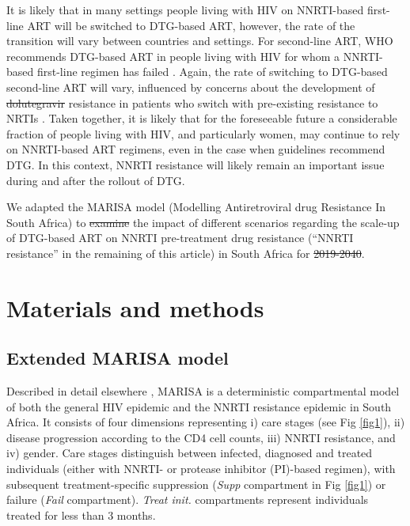 \documentclass[10pt,letterpaper]{article}
\providecommand{\DIFaddtex}[1]{{\protect\color{blue}\uwave{#1}}} %
\providecommand{\DIFdeltex}[1]{{\protect\color{red}\sout{#1}}}                      %
\providecommand{\DIFaddbegin}{} %
\providecommand{\DIFaddend}{} %
\providecommand{\DIFdelbegin}{} %
\providecommand{\DIFdelend}{} %
\providecommand{\DIFadd}[1]{\texorpdfstring{\DIFaddtex{#1}}{#1}} %
\providecommand{\DIFdel}[1]{\texorpdfstring{\DIFdeltex{#1}}{}} %
\newcommand{\DIFscaledelfig}{0.5}
\newlength{\DIFdelgraphicswidth} %
\newlength{\DIFdelgraphicsheight} %
\newcommand{\DIFaddincludegraphics}[2][]{{\color{blue}\fbox{\DIFOincludegraphics[#1]{#2}}}} %
\newcommand{\DIFdelincludegraphics}[2][]{%
\sbox{\DIFdelgraphicsbox}{\DIFOincludegraphics[#1]{#2}}%
\settoboxwidth{\DIFdelgraphicswidth}{\DIFdelgraphicsbox} %
\settoboxtotalheight{\DIFdelgraphicsheight}{\DIFdelgraphicsbox} %
\scalebox{\DIFscaledelfig}{%
\parbox[b]{\DIFdelgraphicswidth}{\usebox{\DIFdelgraphicsbox}\\[-\baselineskip] \rule{\DIFdelgraphicswidth}{0em}}\llap{\resizebox{\DIFdelgraphicswidth}{\DIFdelgraphicsheight}{%
\setlength{\unitlength}{\DIFdelgraphicswidth}%
\begin{picture}(1,1)%
\thicklines\linethickness{2pt} %
{\color[rgb]{1,0,0}\put(0,0){\framebox(1,1){}}}%
{\color[rgb]{1,0,0}\put(0,0){\line( 1,1){1}}}%
{\color[rgb]{1,0,0}\put(0,1){\line(1,-1){1}}}%
\end{picture}%
}\hspace*{3pt}}} %
} %
\DeclareRobustCommand{\DIFaddbegin}{\DIFOaddbegin \let\includegraphics\DIFaddincludegraphics} %
\DeclareRobustCommand{\DIFaddend}{\DIFOaddend \let\includegraphics\DIFOincludegraphics} %
\DeclareRobustCommand{\DIFdelbegin}{\DIFOdelbegin \let\includegraphics\DIFdelincludegraphics} %
\DeclareRobustCommand{\DIFdelend}{\DIFOaddend \let\includegraphics\DIFOincludegraphics} %
\begin{document}
It is likely that in many settings people living with HIV on NNRTI-based first-line ART will be switched to DTG-based ART, however, the rate of the transition will vary between countries and settings. For second-line ART, WHO recommends DTG-based ART in people living with HIV for whom a NNRTI-based first-line regimen has failed \cite{WHO2019}. Again, the rate of switching to DTG-based second-line ART will vary, influenced by concerns about the development of \DIFdelbegin \DIFdel{dolutegravir }\DIFdelend \DIFaddbegin \DIFadd{DTG }\DIFaddend resistance in patients who switch with pre-existing resistance to NRTIs \cite{Inzaule2019}. Taken together, it is likely that for the foreseeable  future a considerable fraction of people living with HIV, and particularly women, may continue to rely on NNRTI-based ART regimens, even in the case when guidelines recommend DTG. In this context, NNRTI resistance will likely remain an important issue during and after the rollout of DTG. 

We adapted the MARISA model (Modelling Antiretroviral drug Resistance In South Africa) \cite{Hauser2019} to \DIFdelbegin \DIFdel{examine }\DIFdelend \DIFaddbegin \DIFadd{predict }\DIFaddend the impact of different scenarios regarding the scale-up of DTG-based ART on NNRTI pre-treatment drug resistance (“NNRTI resistance” in the remaining of this article) in South Africa for \DIFdelbegin \DIFdel{2019-2040}\DIFdelend \DIFaddbegin \DIFadd{2020-2040}\DIFaddend .

\section*{Materials and methods}
\subsection*{Extended MARISA model}
Described in detail elsewhere \cite{Hauser2019}, MARISA is a deterministic compartmental model of both the general HIV epidemic and the NNRTI resistance epidemic in South Africa. It consists of four dimensions representing i) care stages (see Fig \ref{fig1}), ii) disease progression according to the CD4 cell counts, iii) NNRTI resistance, and iv) gender. Care stages distinguish between infected, diagnosed and treated individuals (either with NNRTI- or protease inhibitor (PI)-based regimen), with subsequent treatment-specific suppression (\textit{Supp} compartment in Fig \ref{fig1}) or failure (\textit{Fail} compartment). \textit{Treat init.} compartments represent individuals treated for less than 3 months.
\end{document}
